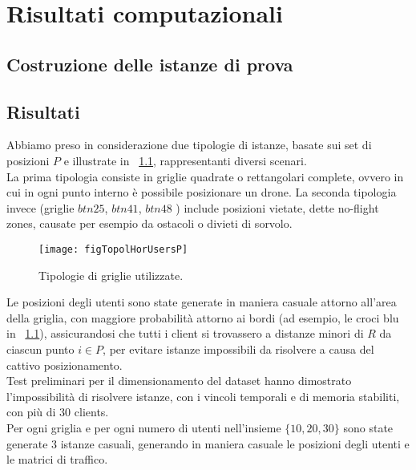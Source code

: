  \chapter{Risultati computazionali} \label{chap:risultati}

\ifpdf
    \graphicspath{{Chapter7/Figs/Raster/}{Chapter7/Figs/PDF/}{Chapter7/Figs/}}
\else
    \graphicspath{{Chapter7/Figs/Vector/}{Chapter7/Figs/}}
\fi

\section{Costruzione delle istanze di prova}

\section{Risultati}
Abbiamo preso in considerazione due tipologie di istanze, basate sui set di posizioni $P$ e illustrate in \figurename\ \ref{figP}, rappresentanti diversi scenari. \\
La prima tipologia consiste in griglie quadrate o rettangolari complete, ovvero in cui in ogni punto interno è possibile posizionare un drone. La seconda tipologia invece (griglie $btn25$, $btn41$, $btn48$ \cite{degioPal2013}) include posizioni vietate, dette no-flight zones, causate per esempio da ostacoli o divieti di sorvolo. \\
%
\begin{figure}
	\begin{center}
		\texttt{[image: figTopolHorUsersP]}
	\end{center}
	\caption{Tipologie di griglie utilizzate.} \label{figP}
\end{figure}
%
Le posizioni degli utenti sono state generate in maniera casuale attorno all'area della griglia, con maggiore probabilità attorno ai bordi (ad esempio, le croci blu in \figurename\ \ref{figP}), assicurandosi che tutti i client si trovassero a distanze minori di $R$ da ciascun punto $i \in P$, per evitare istanze impossibili da risolvere a causa del cattivo posizionamento. \\
Test preliminari per il dimensionamento del dataset hanno dimostrato l'impossibilità di risolvere istanze, con i vincoli temporali e di memoria stabiliti, con più di 30 clients. \\ Per ogni griglia e per ogni numero di utenti nell'insieme $\{10, 20, 30\}$ sono state generate 3 istanze casuali, generando in maniera casuale le posizioni degli utenti e le matrici di traffico. \\ 
